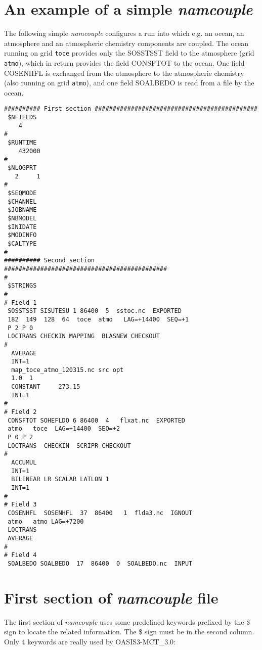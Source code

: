 \section{An example of a simple {\it namcouple}}
\label{subsec_examplenamcouple}

The following simple {\it namcouple} configures a run into which e.g. an
ocean, an atmosphere and an atmospheric chemistry components are
coupled. The ocean running on grid {\tt toce} provides only the SOSSTSST field to the atmosphere (grid {\tt atmo}),
which in return provides the field CONSFTOT to the ocean. One field
COSENHFL is exchanged from the atmosphere to the atmospheric
chemistry (also running on grid {\tt atmo}), and one field SOALBEDO is read from a file by the ocean.

\begin{verbatim}
########## First section #############################################
 $NFIELDS
    4  
#
 $RUNTIME
    432000
#
 $NLOGPRT
   2     1
#
 $SEQMODE
 $CHANNEL
 $JOBNAME
 $NBMODEL
 $INIDATE
 $MODINFO
 $CALTYPE
#
########## Second section #############################################
#
 $STRINGS
#
# Field 1
 SOSSTSST SISUTESU 1 86400  5  sstoc.nc  EXPORTED
 182  149  128  64  toce  atmo   LAG=+14400  SEQ=+1
 P 2 P 0
 LOCTRANS CHECKIN MAPPING  BLASNEW CHECKOUT 
#
  AVERAGE 
  INT=1
  map_toce_atmo_120315.nc src opt
  1.0  1
  CONSTANT     273.15 
  INT=1
#
# Field 2
 CONSFTOT SOHEFLDO 6 86400  4   flxat.nc  EXPORTED
 atmo   toce  LAG=+14400  SEQ=+2
 P 0 P 2
 LOCTRANS  CHECKIN  SCRIPR CHECKOUT
#
  ACCUMUL 
  INT=1
  BILINEAR LR SCALAR LATLON 1
  INT=1
#
# Field 3
 COSENHFL  SOSENHFL  37  86400   1  flda3.nc  IGNOUT 
 atmo   atmo LAG=+7200 
 LOCTRANS
 AVERAGE
#
# Field 4
 SOALBEDO SOALBEDO  17  86400  0  SOALBEDO.nc  INPUT
\end{verbatim}


\section{ First section of {\it namcouple} file}
\label{subsec_namcouplefirst}

The first section of {\it namcouple } uses some predefined keywords
prefixed by the \$ sign to locate the related information. The \$ sign
must be in the second column. Only 4 keywords are really used by OASIS3-MCT\_3.0:

